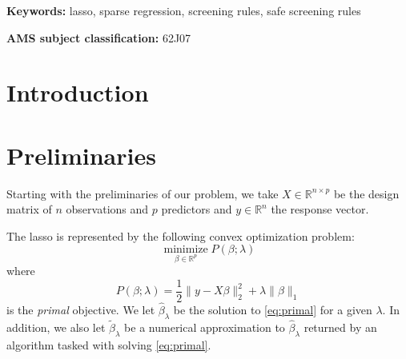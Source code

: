 \documentclass[b5paper,10pt,abstractoff,DIV=calc,headings=normal,twoside]{scrartcl}
\def\AMS#1{\par\noindent \textbf{AMS subject classification: }#1\par}
\newcommand{\keywords}[1]{\par\noindent\textbf{Keywords: }#1}
\theoremstyle{plain}
\theoremstyle{definition}
\theoremstyle{remark}
\begin{document}
\keywords{lasso, sparse regression, screening rules, safe screening rules}

\smallskip

\AMS{62J07}


\section{Introduction}

\section{Preliminaries}%
\label{sec:preliminaries}

Starting with the preliminaries of our problem, we take \(X \in \mathbb{R}^{n
  \times p}\) be the design matrix of \(n\) observations and \(p\) predictors
and \(y \in \mathbb{R}^n\) the response vector.

The lasso is represented by the following convex optimization problem:
\begin{equation}
  \label{eq:primal}
  \operatorname*{minimize}_{\beta \in \mathbb{R}^p} P(\beta; \lambda)
\end{equation}
where
\begin{equation}
  P(\beta; \lambda) =
  \frac 1 2 \lVert y - X\beta \rVert_2^2 + \lambda \lVert \beta \rVert_1
\end{equation}
is the \emph{primal} objective. We let \(\hat \beta_\lambda\) be the solution to
\eqref{eq:primal} for a given \(\lambda\). In addition, we also let \(\tilde
\beta_\lambda\) be a numerical approximation to \(\hat\beta_\lambda\)
returned by an algorithm
tasked with solving \eqref{eq:primal}.
\end{document}
